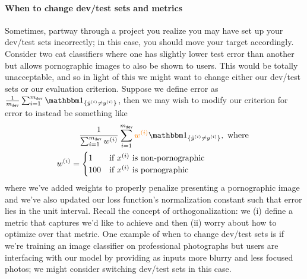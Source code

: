 \documentclass[12pt]{article}
\begin{document}
\paragraph{When to change dev/test sets and metrics} Sometimes, partway through a project you realize you may have
set up your dev/test sets incorrectly; in this case, you should move your target accordingly. Consider two cat classifiers where one has slightly lower test error than another but allows pornographic images to also be shown to users.
This would be totally unacceptable, and so in light of this we might want to change either our dev/test sets or our
evaluation criterion. Suppose we define error as $\frac{1}{m_{\texttt{dev}}} \sum_{i=1}^{m_{\texttt{dev}}} \mathbbm 1_{\{\hat y^{(i)} \neq y^{(i)}\}}$, then we may wish to modify our criterion for error to instead be something like
\begin{align*}   & \hspace{10pt} \frac{1}{\sum_{i=1}^{m_{\texttt{dev}}} w^{(i)}} \sum_{i=1}^{m_{\texttt{dev}}} \color{orange}{w^{(i)}} \color{black} \mathbbm 1_{\{\hat y^{(i)} \neq y^{(i)}\}}, \textrm{ where } \\
  w^{(i)} &= \begin{cases}     1 & \textrm{if } x^{(i)} \textrm{ is non-pornographic} \\
    100 & \textrm{if } x^{(i)} \textrm{ is pornographic}   \end{cases} \end{align*} where we've added weights to properly penalize presenting a pornographic 
image and we've also updated our loss function's normalization constant such that error lies in the unit interval.
Recall the concept of orthogonalization: we (i) define a metric that captures we'd like to achieve and then (ii) 
worry about how to optimize over that metric. One example of when to change dev/test sets is if we're training an image classifier on professional photographs but users are interfacing with our model by providing as inputs more blurry
and less focused photos; we might consider switching dev/test sets in this case.
\end{document}
